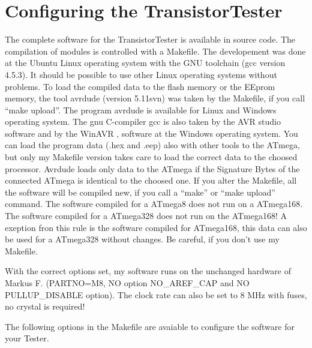 \chapter{Configuring the TransistorTester}
\label{sec:config}
The complete software for the TransistorTester is available in source code.
The compilation of modules is controlled with a Makefile. The developement was done
at the Ubuntu Linux operating system with the GNU toolchain (gcc version 4.5.3).
It should be possible to use other Linux operating systems without problems.
To load the compiled data to the flash memory or
the EEprom memory, the tool avrdude (version 5.11svn) was taken by the Makefile, if you call ``make upload''.
 The program avrdude \cite{avrdude} is available for Linux and Windows operating system.
The gnu C-compiler gcc is also taken by the AVR studio software and
by the WinAVR \cite{winavr1},\cite{winavr2} software at the Windows operating system.
You can load the program data (.hex and .eep) also with other tools to the ATmega,
but only my Makefile version takes care to load the correct data to the choosed processor.
Avrdude loads only data to the ATmega if the Signature Bytes of the connected ATmega is
identical to the choosed one. 
If you alter the Makefile, all the software will be compiled new, if you call a ``make'' or
``make upload'' command. The software compiled for a ATmega8 does not run on a ATmega168.
The software compiled for a ATmega328 does not run on the ATmega168! 
A exeption fron this rule is the software compiled for ATmega168, this data can also be used
for a ATmega328 without changes.
Be careful, if you don't use my Makefile.

With the correct options set, my software runs on the unchanged hardware of Markus F.
(PARTNO=M8, NO option NO\_AREF\_CAP and NO PULLUP\_DISABLE option).
The clock rate can also be set to 8 MHz with fuses, no crystal is required!


The following options in the Makefile are avaiable to configure the software for your Tester.

